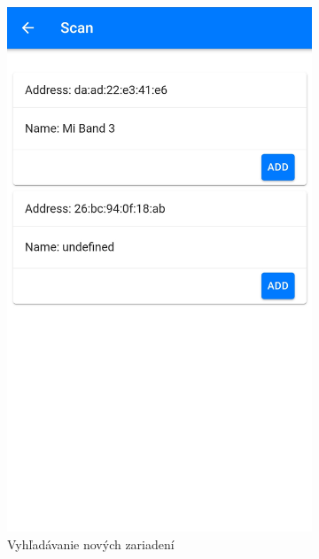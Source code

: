 \begin{figure}[!ht]
    \centering
    \begin{subfigure}{.4\textwidth}
      \centering
      \includegraphics[width=.8\linewidth]{obrazky-figures/screen_scan.jpg}
      \caption{Vyhľadávanie nových zariadení}
      \label{fig:screen_scan}
    \end{subfigure}
    \begin{subfigure}{.4\textwidth}
      \centering

\end{subfigure}
\end{figure}
